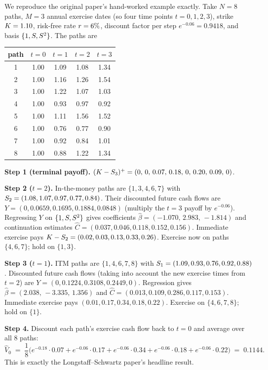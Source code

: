 We reproduce the original paper's hand-worked example exactly.  Take
$N=8$ paths, $M=3$ annual exercise dates (so four time points
$t=0,1,2,3$), strike $K = 1.10$, risk-free rate $r = 6\%$,
discount factor per step $e^{-0.06} = 0.9418$, and basis
$\{1, S, S^2\}$.  The paths are

\begin{center}
\small
\begin{tabular}{c|cccc}
\toprule
path & $t=0$ & $t=1$ & $t=2$ & $t=3$ \\
\midrule
1 & 1.00 & 1.09 & 1.08 & 1.34 \\
2 & 1.00 & 1.16 & 1.26 & 1.54 \\
3 & 1.00 & 1.22 & 1.07 & 1.03 \\
4 & 1.00 & 0.93 & 0.97 & 0.92 \\
5 & 1.00 & 1.11 & 1.56 & 1.52 \\
6 & 1.00 & 0.76 & 0.77 & 0.90 \\
7 & 1.00 & 0.92 & 0.84 & 1.01 \\
8 & 1.00 & 0.88 & 1.22 & 1.34 \\
\bottomrule
\end{tabular}
\end{center}

\textbf{Step 1 (terminal payoff).}
$(K - S_3)^+ = (0,\,0,\,0.07,\,0.18,\,0,\,0.20,\,0.09,\,0)$.

\textbf{Step 2 ($t=2$).}  In-the-money paths are $\{1,3,4,6,7\}$ with
$S_2 = (1.08, 1.07, 0.97, 0.77, 0.84)$.  Their discounted future
cash flows are $Y = (0, 0.0659, 0.1695, 0.1884, 0.0848)$ (multiply the
$t=3$ payoff by $e^{-0.06}$).  Regressing $Y$ on $\{1,S,S^2\}$
gives coefficients $\hat\beta = (-1.070,\, 2.983,\, -1.814)$ and
continuation estimates $\hat C = (0.037, 0.046, 0.118, 0.152, 0.156)$.
Immediate exercise pays $K - S_2 = (0.02, 0.03, 0.13, 0.33,
0.26)$.  Exercise now on paths $\{4, 6, 7\}$; hold on $\{1, 3\}$.

\textbf{Step 3 ($t=1$).}  ITM paths are $\{1, 4, 6, 7, 8\}$ with
$S_1 = (1.09, 0.93, 0.76, 0.92, 0.88)$.  Discounted future cash
flows (taking into account the new exercise times from $t=2$) are
$Y = (0, 0.1224, 0.3108, 0.2449, 0)$.  Regression gives $\hat\beta =
(2.038,\, -3.335,\, 1.356)$ and $\hat C = (0.013, 0.109, 0.286, 0.117,
0.153)$.  Immediate exercise pays $(0.01, 0.17, 0.34, 0.18, 0.22)$.
Exercise on $\{4, 6, 7, 8\}$; hold on $\{1\}$.

\textbf{Step 4.}  Discount each path's exercise cash flow back to
$t=0$ and average over all 8 paths:
\begin{equation}
  \hat V_0 \;=\; \frac{1}{8}\bigl(
      e^{-0.18}\cdot 0.07
    + e^{-0.06}\cdot 0.17
    + e^{-0.06}\cdot 0.34
    + e^{-0.06}\cdot 0.18
    + e^{-0.06}\cdot 0.22 \bigr)
  \;=\; 0.1144.
\end{equation}
This is exactly the Longstaff--Schwartz paper's headline result.

